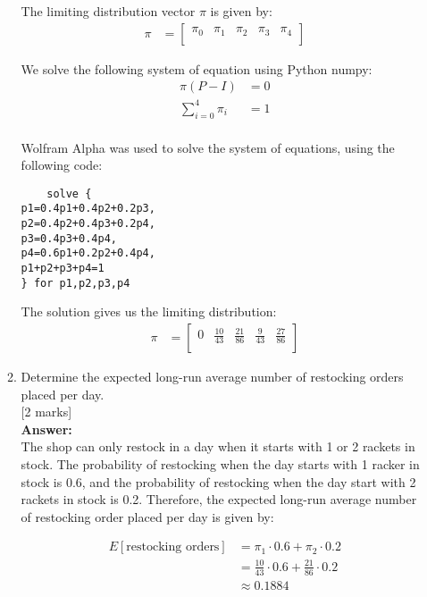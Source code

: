 \documentclass[12pt]{article}
\begin{document}
\begin{enumerate}
\begin{enumerate}
The limiting distribution vector $\pi$ is given by:
\begin{align*}
\pi &= \begin{bmatrix}
\pi_0 & \pi_1 & \pi_2 & \pi_3 & \pi_4 \\
\end{bmatrix}
\end{align*}

We solve the following system of equation using Python numpy:
\begin{align*}
	\pi(P - I) &= 0 \\
	\sum_{i=0}^{4} \pi_i &= 1 \\
\end{align*}

Wolfram Alpha was used to solve the system of equations, using the following code:

\begin{verbatim}
	solve {
p1=0.4p1+0.4p2+0.2p3,
p2=0.4p2+0.4p3+0.2p4,
p3=0.4p3+0.4p4,
p4=0.6p1+0.2p2+0.4p4,
p1+p2+p3+p4=1
} for p1,p2,p3,p4
\end{verbatim}

The solution gives us the limiting distribution: 
\begin{align*}
\pi &= 
\begin{bmatrix}
0 & \frac{10}{43} & \frac{21}{86} & \frac{9}{43} & \frac{27}{86} \\
\end{bmatrix}
\end{align*}

\item Determine the expected long-run average number of restocking orders placed per day. 
			\\\phantom{1}\hfill [2 marks]
%
\\
\textbf{Answer:}
\\
The shop can only restock in a day when it starts with 1 or 2 rackets in stock. The probability of restocking when the day starts with 1 racker in stock is 0.6, and the probability of restocking when the day start with 2 rackets in stock is 0.2. Therefore, the expected long-run average number of restocking order placed per day is given by:

\begin{align*}
E[\text{restocking orders}] &= \pi_1 \cdot 0.6 + \pi_2 \cdot 0.2 \\
&= \frac{10}{43} \cdot 0.6 + \frac{21}{86} \cdot 0.2 \\
&\approx 0.1884 \\
\end{align*}
%


\end{enumerate}
\end{enumerate}
\end{document}

